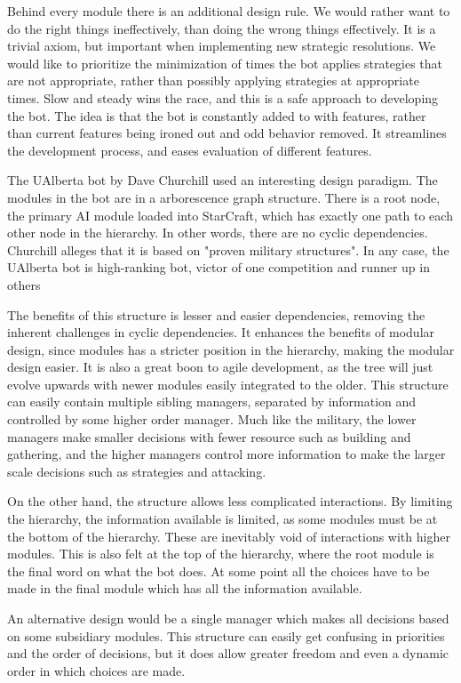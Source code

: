 Behind every module there is an additional design rule. We would rather want to do the right things ineffectively, than doing the wrong things effectively. It is a trivial axiom, but important when implementing new strategic resolutions. We would like to prioritize the minimization of times the bot applies strategies that are not appropriate, rather than possibly applying strategies at appropriate times. Slow and steady wins the race, and this is a safe approach to developing the bot. The idea is that the bot is constantly added to with features, rather than current features being ironed out and odd behavior removed. It streamlines the development process, and eases evaluation of different features.

The UAlberta bot by Dave Churchill used an interesting design paradigm. The modules in the bot are in a arborescence graph structure. There is a root node, the primary AI module loaded into StarCraft, which has exactly one path to each other node in the hierarchy. In other words, there are no cyclic dependencies. Churchill alleges that it is based on "proven military structures". In any case, the UAlberta bot is high-ranking bot, victor of one competition and runner up in others

The benefits of this structure is lesser and easier dependencies, removing the inherent challenges in cyclic dependencies. It enhances the benefits of modular design, since modules has a stricter position in the hierarchy, making the modular design easier. It is also a great boon to agile development, as the tree will just evolve upwards with newer modules easily integrated to the older. This structure can easily contain multiple sibling managers, separated by information and controlled by some higher order manager. Much like the military, the lower managers make smaller decisions with fewer resource such as building and gathering, and the higher managers control more information to make the larger scale decisions such as strategies and attacking.

On the other hand, the structure allows less complicated interactions. By limiting the hierarchy, the information available is limited, as some modules must be at the bottom of the hierarchy. These are inevitably void of interactions with higher modules. This is also felt at the top of the hierarchy, where the root module is the final word on what the bot does. At some point all the choices have to be made in the final module which has all the information available.

An alternative design would be a single manager which makes all decisions based on some subsidiary modules. This structure can easily get confusing in priorities and the order of decisions, but it does allow greater freedom and even a dynamic order in which choices are made.